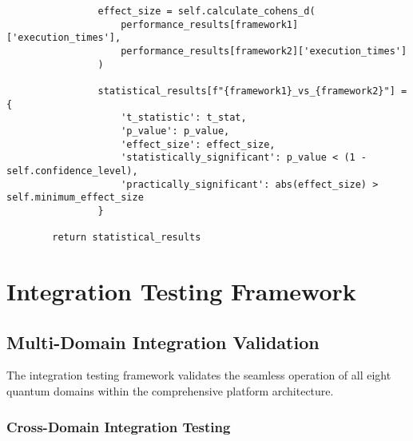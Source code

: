 \documentclass[12pt,a4paper]{report}
\begin{document}
\begin{lstlisting}
                effect_size = self.calculate_cohens_d(
                    performance_results[framework1]['execution_times'],
                    performance_results[framework2]['execution_times']
                )

                statistical_results[f"{framework1}_vs_{framework2}"] = {
                    't_statistic': t_stat,
                    'p_value': p_value,
                    'effect_size': effect_size,
                    'statistically_significant': p_value < (1 - self.confidence_level),
                    'practically_significant': abs(effect_size) > self.minimum_effect_size
                }

        return statistical_results
\end{lstlisting}

\section{Integration Testing Framework}

\subsection{Multi-Domain Integration Validation}

The integration testing framework validates the seamless operation of all eight quantum domains within the comprehensive platform architecture.

\subsubsection{Cross-Domain Integration Testing}
\end{document}
